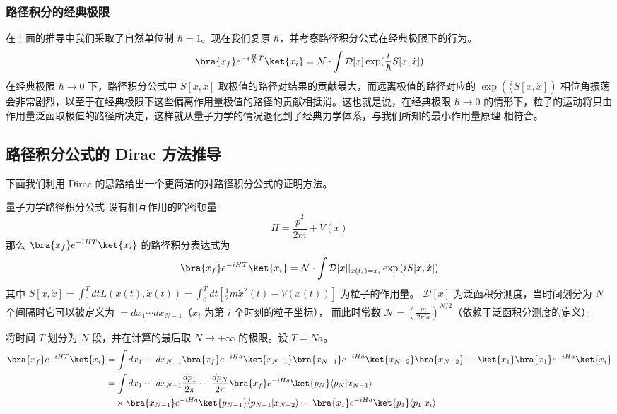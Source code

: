 \subsubsection{路径积分的经典极限}
在上面的推导中我们采取了自然单位制 $\hbar=1$。现在我们复原 $\hbar$，并考察路径积分公式在经典极限下的行为。
\begin{equation}
\bra{x_f} e^{-i\frac{H}{\hbar}T}\ket{x_i}=\mathcal{N}\cdot \int \mathcal{D}[x] \exp(\frac{i}{\hbar}S[x,\dot x])
\end{equation}
在经典极限 $\hbar\rightarrow 0$ 下，路径积分公式中 $S[x,\dot x]$ 取极值的路径对结果的贡献最大，而远离极值的路径对应的 $\exp(\frac{i}{\hbar}S[x,\dot x])$ 相位角振荡会非常剧烈，以至于在经典极限下这些偏离作用量极值的路径的贡献相抵消。这也就是说，在经典极限 $\hbar\rightarrow 0$ 的情形下，粒子的运动将只由作用量泛函取极值的路径所决定，这样就从量子力学的情况退化到了经典力学体系，与我们所知的最小作用量原理 相符合。

\subsection{路径积分公式的 Dirac 方法推导}
下面我们利用 Dirac 的思路给出一个更简洁的对路径积分公式的证明方法。
\begin{theorem}{量子力学路径积分公式}\label{the_PIntQM_1}
    设有相互作用的哈密顿量
    \begin{equation}
        H=\frac{\hat p^2}{2m}+V(x)
    \end{equation}
    那么 $\bra{x_f}e^{-iHT}\ket{x_i}$ 的路径积分表达式为
    \begin{equation}
        \bra{x_f}e^{-iHT}\ket{x_i}=\mathcal{N}\cdot\int \mathcal D[x]|_{x(t_i)=x_i} \exp\left(iS[x,\dot x]\right)
    \end{equation}
    其中 $S[x,\dot x]=\int_0^T d t L(x(t),\dot x(t))=\int_0^T d t \left[\frac{1}{2}m\dot{x}^2(t)-V(x(t))\right]$ 为粒子的作用量。
    $\mathcal D[x]$ 为泛函积分测度，当时间划分为 $N$ 个间隔时它可以被定义为 $=d x_1\cdots d x_{N-1}$（$x_i$ 为第 $i$ 个时刻的粒子坐标），
    而此时常数 $\mathcal N=\left(\frac{m}{2\pi i a}\right)^{N/2}$（依赖于泛函积分测度的定义）。
\end{theorem}

将时间 $T$ 划分为 $N$ 段，并在计算的最后取 $N\rightarrow +\infty$ 的极限。设 $T=Na$。
\begin{equation}
\begin{aligned}
        \bra{x_f}e^{-iHT}\ket{x_i}&=\int d x_1\cdots d x_{N-1}
        \bra{x_f}e^{-iH a}\ket{x_{N-1}}\bra{x_{N-1}}e^{-iH a}
        \ket{x_{N-2}}\bra{x_{N-2}}\cdots \ket{x_{1}}\bra{x_{1}}e^{-iH a}\ket{x_i}
        \\
        &=\int d x_1\cdots d x_{N-1}\frac{d p_1}{2\pi} \cdots \frac{d p_N}{2\pi}
        \bra{x_f}e^{-iH a}\ket{p_N}\langle p_N|x_{N-1}\rangle 
        \\
        &\quad \times\bra{x_{N-1}}e^{-iH a}
        \ket{p_{N-1}}\langle p_{N-1}|x_{N-2}\rangle
        \cdots \bra{x_{1}}e^{-iH a}\ket{p_1}\langle p_1 | x_i\rangle
\end{aligned}
\end{equation}

